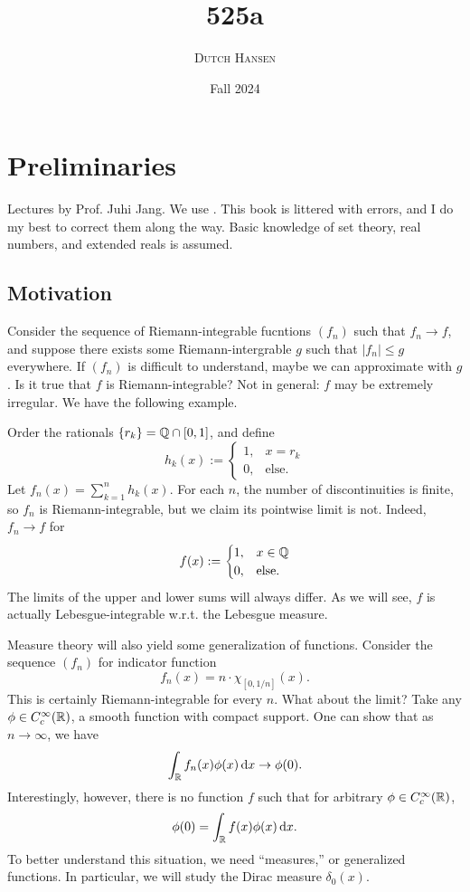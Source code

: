 \documentclass[12pt]{article} %
\title{525a}
\author{\textsc{Dutch Hansen}}
\date{\normalsize{Fall 2024}}
\begin{document}
\maketitle

\pagebreak

\tableofcontents

\pagebreak

\section{Preliminaries}

Lectures by Prof. Juhi Jang. We use \cite{folland1999real}. This book is littered with errors, and I do my best to correct them along the way. Basic knowledge of set theory, real numbers, and extended reals is assumed.

\subsection{Motivation}

\begin{example}
    Consider the sequence of Riemann-integrable fucntions $(f_n)$ such that $f_n \to f$, and suppose there exists some Riemann-intergrable $g$ such that $|f_n| \leq g$ everywhere. If $(f_n)$ is difficult to understand, maybe we can approximate with $g$. Is it true that $f$ is Riemann-integrable? Not in general: $f$ may be extremely irregular. We have the following example.

    Order the rationals $\{r_k\} = \mathbb{Q} \cap [0,1]$, and define \[h_k(x) := \begin{cases}
        1, &x = r_k\\
        0, &\text{else}.
    \end{cases}\] Let $f_n(x) = \sum_{k=1}^{n} h_k(x)$. For each $n$, the number of discontinuities is finite, so $f_n$ is Riemann-integrable, but we claim its pointwise limit is not. Indeed, $f_n \to f$ for \[f(x) := \begin{cases}
        1, &x \in \mathbb{Q}\\
        0, &\text{else}.
    \end{cases}\] The limits of the upper and lower sums will always differ. As we will see, $f$ is actually Lebesgue-integrable w.r.t. the Lebesgue measure.
\end{example}

\begin{example}
    Measure theory will also yield some generalization of functions. Consider the sequence $(f_n)$ for indicator function \[f_n(x) = n \cdot \chi_{[0, 1/n]}(x).\] This is certainly Riemann-integrable for every $n$. What about the limit? Take any $\phi \in C_c^{\infty}(\mathbb{R})$, a smooth function with compact support. One can show that as $n \to \infty$, we have \[\int_{\mathbb{R}} f_n(x) \phi(x) \, \mathrm{d} x \to \phi(0).\] Interestingly, however, there is no function $f$ such that for arbitrary $\phi \in C_c^{\infty}(\mathbb{R})$, \[\phi(0) = \int_{\mathbb{R}} f(x) \phi(x) \, \mathrm{d} x.\] To better understand this situation, we need ``measures,'' or generalized functions. In particular, we will study the Dirac measure $\delta_0(x)$.
\end{example}
\end{document}
